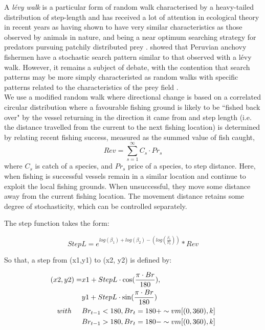 \documentclass[review]{elsarticle}
\begin{document}
A \textit{lévy walk} is a particular form of random walk characterised by a
heavy-tailed distribution of step-length and has received a lot of attention in
ecological theory in recent years as having shown to have very similar
characteristics as those observed by animals in nature, and being a near
optimum searching strategy for predators pursuing patchily distributed prey
\cite{Bartumeus2005, Sims2008}.  \cite{Bertrand2007} showed that Peruvian
anchovy fishermen have a stochastic search pattern similar to that observed
with a lévy walk. However, it remains a subject of debate, with the contention
that search patterns may be more simply characteristed as random walks
\cite{Sakiyama2013} with specific patterns related to the characteristics of
the prey field \cite{Sims2012}. \\

We use a modified random walk where directional change is based on a correlated
circular distribution where a favourable fishing ground is likely to be ``fished
back over" by the vessel returning in the direction it came from and step
length (i.e. the distance travelled from the current to the next fishing
location) is determined by relating recent fishing success, measured as the
summed value of fish caught, $$Rev = \sum_{s=1}^{\infty} C_{s} \cdot Pr_{s}$$
where $C_{s}$ is catch of a species, and $Pr_{s}$ price of a species, to step
distance. Here, when fishing is successful vessels remain in a similar location
and continue to exploit the local fishing grounds. When unsuccessful, they move
some distance away from the current fishing location. The movement distance
retains some degree of stochasticity, which can be controlled separately. 

The step function takes the form:

\begin{equation*}
	StepL = e^{log(\beta_{1}) + log(\beta_{2}) - (log(\frac{\beta_{1}}{\beta_{3}}))} * Rev
\end{equation*}

So that, a step from (x1,y1) to (x2, y2) is defined by:

\begin{equation*}
	\begin{split}
 (x2, y2) =  & x1 + StepL \cdot \cos (\frac{\pi \cdot Br}{180}), \\
             & y1 + StepL \cdot \sin (\frac{\pi \cdot Br}{180}) \\	
 with  \hspace{0.5cm}     & Br_{t-1} < 180, Br_{t} = 180 + \sim vm[(0,360), k] \\
 			  & Br_{t-1} > 180, Br_{t} = 180 - \sim vm[(0,360), k] \\
	\end{split}
\end{equation*}
\end{document}
